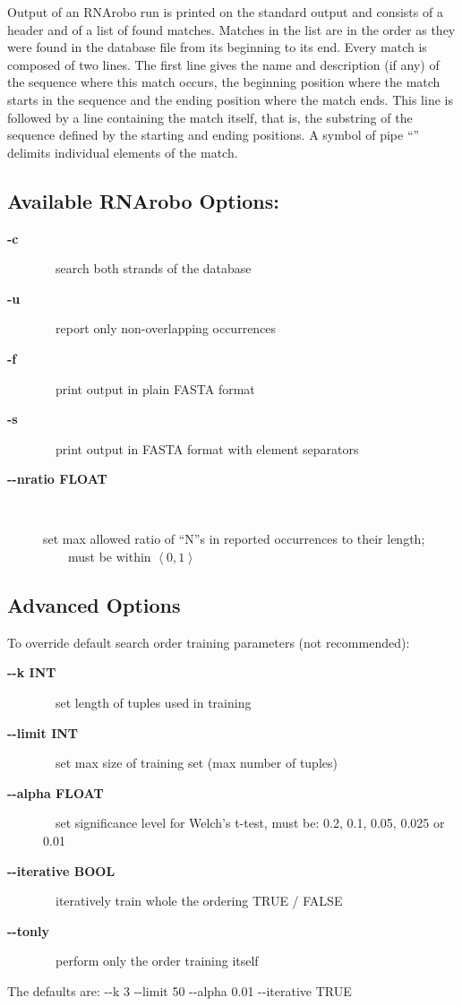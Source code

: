 \documentclass[11pt]{article}
\begin{document}
Output of an RNArobo run is printed on the standard output and consists of a header and of a list of found matches. Matches in the list are in the order as they were found in the database file from its beginning to its end. Every match is composed of two lines. The first line gives the name and description (if any) of the sequence where this match occurs, the beginning position where the match starts in the sequence and the ending position where the match ends. This line is followed by a line containing the match itself, that is, the substring of the sequence defined by the starting and ending positions. A symbol of pipe ``\textbar'' delimits individual elements of the match.

\subsection*{Available RNArobo Options:}
\begin{description}
\item[\textbf{-c}] ~~search both strands of the database
\item[\textbf{-u}] ~~report only non-overlapping occurrences
\item[\textbf{-f}] ~~print output in plain FASTA format
\item[\textbf{-s}] ~~print output in FASTA format with element separators
\item[\textbf{-{}-nratio FLOAT}] ~
\begin{minipage}{0.7\textwidth}
set max allowed ratio of ``N''s in reported occurrences to their length;\\
~~~~must be within  $\left\langle 0, 1 \right\rangle$
\end{minipage} 
\end{description}

\subsection*{Advanced Options}
To override default search order training parameters (not recommended):
\begin{description}
\item[\textbf{-{}-k INT}] ~~set length of tuples used in training
\item[\textbf{-{}-limit INT}] ~~set max size of training set (max number of tuples)
\item[\textbf{-{}-alpha FLOAT}] ~~set significance level for Welch's t-test, must be: 0.2, 0.1, 0.05, 0.025 or 0.01
\item[\textbf{-{}-iterative BOOL}] ~~iteratively train whole the ordering TRUE / FALSE
\item[\textbf{-{}-tonly}] ~~perform only the order training itself
\end{description}
The defaults are: -{}-k 3 -{}-limit 50 -{}-alpha 0.01 -{}-iterative TRUE


 
\end{document}
